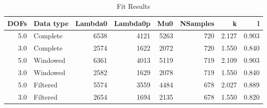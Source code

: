\begin{table}
\centering
\caption{Fit Results}
\begin{tabular}{rlrrrrrr}
\toprule
 DOFs & Data type &  Lambda0 &  Lambda0p &   Mu0 &  NSamples &      k &      l \\
\midrule
  5.0 &  Complete &     6538 &      4121 &  5263 &       720 &  2.127 &  0.903 \\
  3.0 &  Complete &     2574 &      1622 &  2072 &       720 &  1.550 &  0.840 \\
  5.0 &  Windowed &     6361 &      4013 &  5119 &       719 &  2.109 &  0.903 \\
  3.0 &  Windowed &     2582 &      1629 &  2078 &       719 &  1.550 &  0.840 \\
  5.0 &  Filtered &     5574 &      3559 &  4484 &       678 &  2.027 &  0.889 \\
  3.0 &  Filtered &     2654 &      1694 &  2135 &       678 &  1.550 &  0.820 \\
\bottomrule
\end{tabular}
\end{table}
